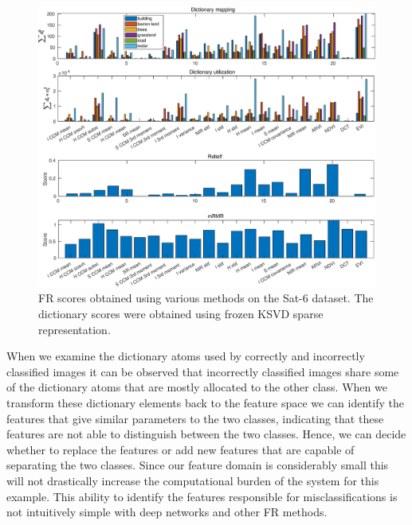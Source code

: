 \begin{figure}[!t]%
\centering
\includegraphics[width=\columnwidth]{figures/SR/Dict_FR.eps}
\caption{FR scores obtained using various methods on the Sat-6 dataset. The dictionary scores were obtained using frozen KSVD sparse representation.}%
\label{fig:FR}%
\end{figure}



When we examine the dictionary atoms used by correctly and incorrectly classified images it can be observed that incorrectly classified images share some of the dictionary atoms that are mostly allocated to the other class. When we transform these dictionary elements back to the feature space we can identify the features that give similar parameters to the two classes, indicating that these features are not able to distinguish between the two classes. Hence, we can decide whether to replace the features or add new features that are capable of separating the two classes. Since our feature domain is considerably small this will not drastically increase the computational burden of the system for this example. This ability to identify the features responsible for misclassifications is not intuitively simple with deep networks and other FR methods. 

